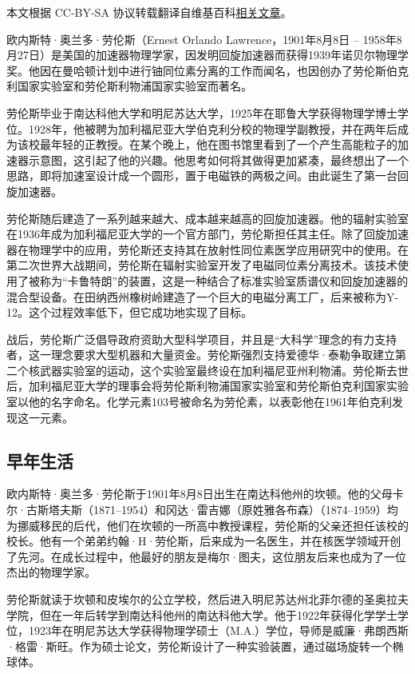 
本文根据 CC-BY-SA 协议转载翻译自维基百科\href{https://en.wikipedia.org/wiki/Ernest_Lawrence}{相关文章}。

欧内斯特·奥兰多·劳伦斯（Ernest Orlando Lawrence，1901年8月8日 – 1958年8月27日）是美国的加速器物理学家，因发明回旋加速器而获得1939年诺贝尔物理学奖。他因在曼哈顿计划中进行铀同位素分离的工作而闻名，也因创办了劳伦斯伯克利国家实验室和劳伦斯利物浦国家实验室而著名。

劳伦斯毕业于南达科他大学和明尼苏达大学，1925年在耶鲁大学获得物理学博士学位。1928年，他被聘为加利福尼亚大学伯克利分校的物理学副教授，并在两年后成为该校最年轻的正教授。在某个晚上，他在图书馆里看到了一个产生高能粒子的加速器示意图，这引起了他的兴趣。他思考如何将其做得更加紧凑，最终想出了一个思路，即将加速室设计成一个圆形，置于电磁铁的两极之间。由此诞生了第一台回旋加速器。

劳伦斯随后建造了一系列越来越大、成本越来越高的回旋加速器。他的辐射实验室在1936年成为加利福尼亚大学的一个官方部门，劳伦斯担任其主任。除了回旋加速器在物理学中的应用，劳伦斯还支持其在放射性同位素医学应用研究中的使用。在第二次世界大战期间，劳伦斯在辐射实验室开发了电磁同位素分离技术。该技术使用了被称为“卡鲁特朗”的装置，这是一种结合了标准实验室质谱仪和回旋加速器的混合型设备。在田纳西州橡树岭建造了一个巨大的电磁分离工厂，后来被称为Y-12。这个过程效率低下，但它成功地实现了目标。

战后，劳伦斯广泛倡导政府资助大型科学项目，并且是“大科学”理念的有力支持者，这一理念要求大型机器和大量资金。劳伦斯强烈支持爱德华·泰勒争取建立第二个核武器实验室的运动，这个实验室最终设在加利福尼亚州利物浦。劳伦斯去世后，加利福尼亚大学的理事会将劳伦斯利物浦国家实验室和劳伦斯伯克利国家实验室以他的名字命名。化学元素103号被命名为劳伦素，以表彰他在1961年伯克利发现这一元素。
\subsection{早年生活}
欧内斯特·奥兰多·劳伦斯于1901年8月8日出生在南达科他州的坎顿。他的父母卡尔·古斯塔夫斯（1871–1954）和冈达·雷吉娜（原姓雅各布森）（1874–1959）均为挪威移民的后代，他们在坎顿的一所高中教授课程，劳伦斯的父亲还担任该校的校长。他有一个弟弟约翰·H·劳伦斯，后来成为一名医生，并在核医学领域开创了先河。在成长过程中，他最好的朋友是梅尔·图夫，这位朋友后来也成为了一位杰出的物理学家。

劳伦斯就读于坎顿和皮埃尔的公立学校，然后进入明尼苏达州北菲尔德的圣奥拉夫学院，但在一年后转学到南达科他州的南达科他大学。他于1922年获得化学学士学位，1923年在明尼苏达大学获得物理学硕士（M.A.）学位，导师是威廉·弗朗西斯·格雷·斯旺。作为硕士论文，劳伦斯设计了一种实验装置，通过磁场旋转一个椭球体。

